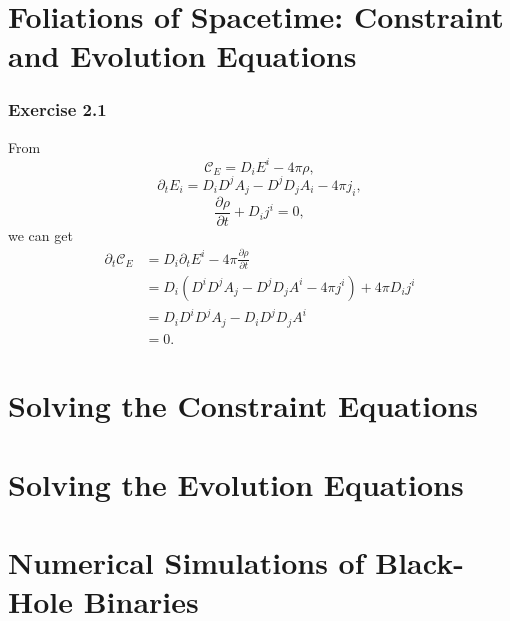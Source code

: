 \documentclass{article}
\begin{document}
\section{Foliations of Spacetime: Constraint and Evolution Equations}

\subsubsection*{Exercise 2.1}
From
\begin{equation}
	\mathcal{C}_E = D_i E^i - 4 \pi \rho,
\end{equation}
\begin{equation}
	\partial_t E_i = D_i D^j A_j - D^j D_j A_i - 4 \pi j_i,
\end{equation}
\begin{equation}
	\frac{\partial \rho}{\partial t} + D_i j^i = 0,
\end{equation}
we can get
\begin{align}
	\partial_t \mathcal{C}_E &= D_i \partial_t E^i - 4\pi \frac{\partial \rho}{\partial t}\\
	&= D_i (D^i D^j A_j - D^j D_j A^i - 4\pi j^i) + 4\pi D_i j^i\\
	&= D_i D^i D^j A_j - D_i D^j D_j A^i\\
	&= 0.
\end{align}

\section{Solving the Constraint Equations}

\section{Solving the Evolution Equations}

\section{Numerical Simulations of Black-Hole Binaries}
\end{document}
